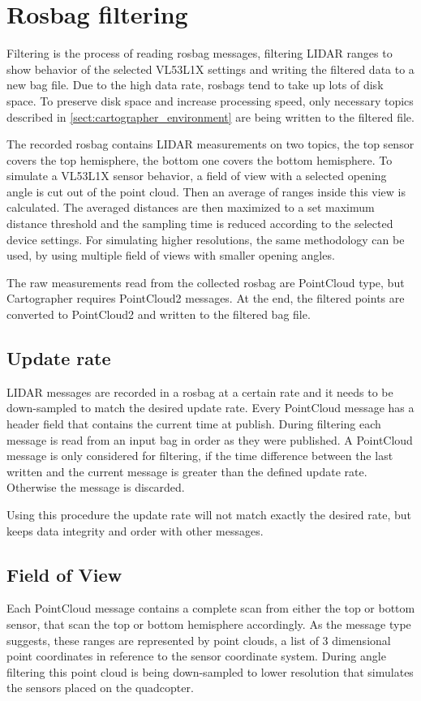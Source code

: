\section{Rosbag filtering}
Filtering is the process of reading rosbag messages, filtering LIDAR ranges to show behavior of the 
selected VL53L1X settings and writing the filtered data to a new bag file. Due to the high data rate, 
rosbags tend to take up lots of disk space. To preserve disk space and increase processing speed,
only necessary topics described in \ref{sect:cartographer_environment} are being written to the filtered file.

The recorded rosbag contains LIDAR measurements on two topics, the top sensor covers the top hemisphere,
the bottom one covers the bottom hemisphere. To simulate a VL53L1X sensor behavior, a field of view with a 
selected opening angle is cut out of the point cloud. Then an average of ranges inside this view is calculated.
The averaged distances are then maximized to a set maximum distance threshold and the sampling time is 
reduced according to the selected device settings. For simulating higher resolutions, the same methodology 
can be used, by using multiple field of views with smaller opening angles.

The raw measurements read from the collected rosbag are PointCloud type, but Cartographer requires 
PointCloud2 messages. At the end, the filtered points are converted to PointCloud2 and written
to the filtered bag file. 

\subsection{Update rate}
LIDAR messages are recorded in a rosbag at a certain rate and it needs to be down-sampled to match
the desired update rate. Every PointCloud message has a header field that contains the current time
at publish. During filtering each message is read from an input bag in order as they were published.
A PointCloud message is only considered for filtering, if the time difference between the last written 
and the current message is greater than the defined update rate. Otherwise the message is discarded.

Using this procedure the update rate will not match exactly the desired rate, but keeps data integrity
and order with other messages. 



\subsection{Field of View}
Each PointCloud message contains a complete scan from either the top or bottom sensor, that scan the 
top or bottom hemisphere accordingly. As the message type suggests, these ranges are represented by 
point clouds, a list of 3 dimensional point coordinates in reference to the sensor coordinate system. During 
angle filtering this point cloud is being down-sampled to lower resolution that simulates the sensors
placed on the quadcopter.

